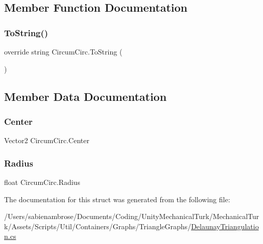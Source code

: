 \subsection{Member Function Documentation}
\mbox{\label{struct_circum_circ_ae51a3357893dd35882d55c01e8784d21}} 
\subsubsection{\texorpdfstring{To\+String()}{ToString()}}
{\footnotesize\ttfamily override string Circum\+Circ.\+To\+String (\begin{DoxyParamCaption}{ }\end{DoxyParamCaption})}



\subsection{Member Data Documentation}
\mbox{\label{struct_circum_circ_ac0b08155df88d5ebfe7970e94bba4adf}} 
\subsubsection{\texorpdfstring{Center}{Center}}
{\footnotesize\ttfamily Vector2 Circum\+Circ.\+Center}

\mbox{\label{struct_circum_circ_a135edc470aa3698901aad8e662c43f02}} 
\subsubsection{\texorpdfstring{Radius}{Radius}}
{\footnotesize\ttfamily float Circum\+Circ.\+Radius}



The documentation for this struct was generated from the following file\+:\begin{DoxyCompactItemize}
\item 
/\+Users/sabienambrose/\+Documents/\+Coding/\+Unity\+Mechanical\+Turk/\+Mechanical\+Turk/\+Assets/\+Scripts/\+Util/\+Containers/\+Graphs/\+Triangle\+Graphs/\mbox{\hyperlink{_delaunay_triangulation_8cs}{Delaunay\+Triangulation.\+cs}}\end{DoxyCompactItemize}
